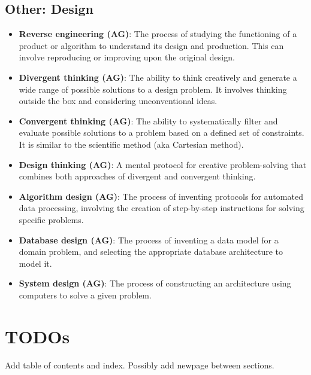 \documentclass{article}
\begin{document}
\subsection*{Other: Design}

\begin{itemize}

	\item \textbf{Reverse engineering (AG)}: The process of studying the functioning of a product or algorithm to understand its design and production. This can involve reproducing or improving upon the original design.

	\item \textbf{Divergent thinking (AG)}: The ability to think creatively and generate a wide range of possible solutions to a design problem. It involves thinking outside the box and considering unconventional ideas.

	\item \textbf{Convergent thinking (AG)}: The ability to systematically filter and evaluate possible solutions to a problem based on a defined set of constraints. It is similar to the scientific method (aka Cartesian method).

	\item \textbf{Design thinking (AG)}: A mental protocol for creative problem-solving that combines both approaches of divergent and convergent thinking.

	\item \textbf{Algorithm design (AG)}: The process of inventing protocols for automated data processing, involving the creation of step-by-step instructions for solving specific problems.

	\item \textbf{Database design (AG)}: The process of inventing a data model for a domain problem, and selecting the appropriate database architecture to model it.

	\item \textbf{System design (AG)}: The process of constructing an architecture using computers to solve a given problem.

\end{itemize}


\newpage



\section*{TODOs}

Add table of contents and index. Possibly add newpage between sections.
\end{document}
